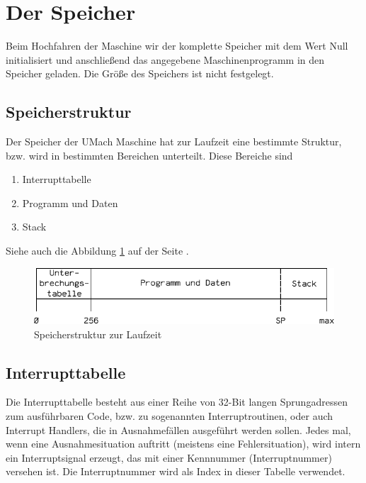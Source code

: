 \section{Der Speicher}
\label{sec:Speicher}

Beim Hochfahren der Maschine wir der komplette Speicher mit dem
Wert Null initialisiert und anschließend das angegebene Maschinenprogramm in den
Speicher geladen. Die Größe des Speichers ist nicht festgelegt.


\subsection{Speicherstruktur}
\label{subsec:Speicherstruktur}

Der Speicher der UMach Maschine hat zur Laufzeit eine bestimmte Struktur, bzw.
wird in bestimmten Bereichen unterteilt. Diese Bereiche sind
\begin{enumerate}
 \item Interrupttabelle
 \item Programm und Daten
 \item Stack
\end{enumerate}

Siehe auch die Abbildung \ref{fig:Speicherstruktur} auf der Seite
\pageref{fig:Speicherstruktur}.

\begin{figure}[htp]
 \centering
 \includegraphics{./img/UMach-Speicherstruktur}
 \caption[Speicherstruktur]{Speicherstruktur zur Laufzeit}
 \label{fig:Speicherstruktur}
\end{figure}



\subsection{Interrupttabelle}
\label{subsubsec:Interrupttabelle}

Die Interrupttabelle besteht aus einer Reihe von 32-Bit langen Sprungadressen
zum ausführbaren Code, bzw. zu sogenannten Interruptroutinen, oder auch \glqq
Interrupt Handlers\grqq, die in Ausnahmefällen ausgeführt werden sollen. Jedes
mal, wenn eine Ausnahmesituation auftritt (meistens eine Fehlersituation), wird
intern ein Interruptsignal erzeugt, das mit einer Kennnummer (Interruptnummer)
versehen ist. Die Interruptnummer wird als Index in dieser Tabelle verwendet.


